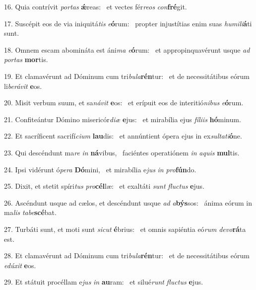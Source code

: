 16. Quia contrívit \textit{por}\textit{tas} \textbf{ǽ}reas: \ast\  et vectes fér\textit{re}\textit{os} \textit{con}\textbf{fré}git.\

17. Suscépit eos de via iniquitá\textit{tis} \textit{e}\textbf{ó}rum: \ast\  propter injustítias enim suas \textit{hu}\textit{mi}\textit{li}\textbf{á}ti sunt.\

18. Omnem escam abomináta est áni\textit{ma} \textit{e}\textbf{ó}rum: \ast\  et appropinquavérunt usque \textit{ad} \textit{por}\textit{tas} \textbf{mor}tis.\

19. Et clamavérunt ad Dóminum cum tri\textit{bu}\textit{la}\textbf{rén}tur: \ast\  et de necessitátibus eórum li\textit{be}\textit{rá}\textit{vit} \textbf{e}os.\

20. Misit verbum suum, et sa\textit{ná}\textit{vit} \textbf{e}os: \ast\  et erípuit eos de interitió\textit{ni}\textit{bus} \textit{e}\textbf{ó}rum.\

21. Confiteántur Dómino misericór\textit{di}\textit{æ} \textbf{e}jus: \ast\  et mirabília ejus \textit{fí}\textit{li}\textit{is} \textbf{hó}minum.\

22. Et sacríficent sacrifí\textit{ci}\textit{um} \textbf{lau}dis: \ast\  et annúntient ópera ejus in ex\textit{sul}\textit{ta}\textit{ti}\textbf{ó}ne.\

23. Qui descéndunt ma\textit{re} \textit{in} \textbf{ná}vibus, \ast\  faciéntes operatiónem \textit{in} \textit{a}\textit{quis} \textbf{mul}tis.\

24. Ipsi vidérunt ó\textit{pe}\textit{ra} \textbf{Dó}mini, \ast\  et mirabília e\textit{jus} \textit{in} \textit{pro}\textbf{fún}do.\

25. Dixit, et stetit spíri\textit{tus} \textit{pro}\textbf{cél}læ: \ast\  et exaltáti \textit{sunt} \textit{fluc}\textit{tus} \textbf{e}jus.\

26. Ascéndunt usque ad cælos, et descéndunt usque \textit{ad} \textit{a}\textbf{býs}sos: \ast\  ánima eórum in ma\textit{lis} \textit{ta}\textit{be}\textbf{scé}bat.\

27. Turbáti sunt, et moti sunt \textit{sic}\textit{ut} \textbf{é}brius: \ast\  et omnis sapiéntia eó\textit{rum} \textit{de}\textit{vo}\textbf{rá}ta est.\

28. Et clamavérunt ad Dóminum cum tri\textit{bu}\textit{la}\textbf{rén}tur: \ast\  et de necessitátibus eórum \textit{e}\textit{dú}\textit{xit} \textbf{e}os.\

29. Et státuit procéllam e\textit{jus} \textit{in} \textbf{au}ram: \ast\  et silué\textit{runt} \textit{fluc}\textit{tus} \textbf{e}jus.\

